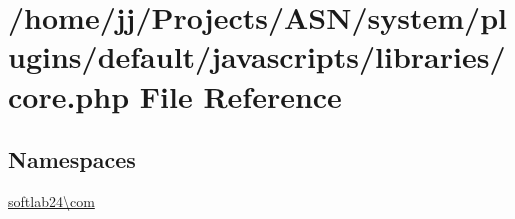 \hypertarget{core_8php}{}\section{/home/jj/\+Projects/\+A\+S\+N/system/plugins/default/javascripts/libraries/core.php File Reference}
\label{core_8php}
\subsection*{Namespaces}
\begin{DoxyCompactItemize}
\item 
 \hyperlink{namespacesoftlab24_1_1com}{softlab24\textbackslash{}com}
\end{DoxyCompactItemize}
